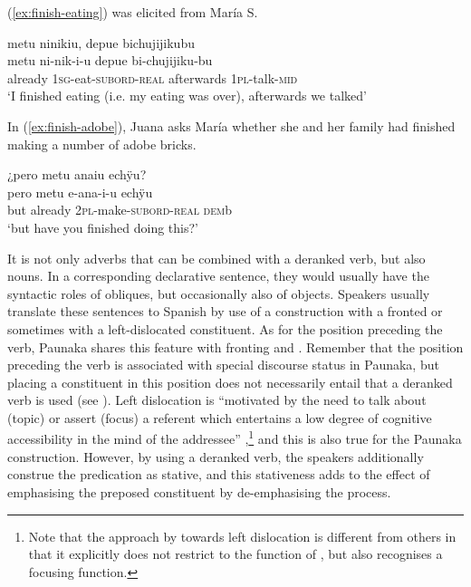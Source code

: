 (\ref{ex:finish-eating}) was elicited from María S.

\ea\label{ex:finish-eating}
\begingl
\glpreamble metu ninikiu, depue bichujijikubu\\
\gla metu ni-nik-i-u depue bi-chujijiku-bu\\
\glb already 1\textsc{sg}-eat-\textsc{subord}-\textsc{real} afterwards 1\textsc{pl}-talk-\textsc{mid}\\
\glft ‘I finished eating (i.e. my eating was over), afterwards we talked’
\endgl
\trailingcitation{[rxx-e181020le]}
\xe

In (\ref{ex:finish-adobe}), Juana asks María whether she and her family had finished making a number of adobe bricks.

\ea\label{ex:finish-adobe}
\begingl
\glpreamble ¿pero metu anaiu echÿu?\\
\gla pero metu e-ana-i-u echÿu\\
\glb but already 2\textsc{pl}-make-\textsc{subord}-\textsc{real} \textsc{dem}b\\
\glft ‘but have you finished doing this?’
\endgl
{}
\xe

It is not only adverbs that can be combined with a deranked verb, but also nouns. In a corresponding declarative sentence, they would usually have the syntactic roles of obliques, but occasionally also of objects. Speakers usually translate these sentences to Spanish by use of a construction with a fronted or sometimes with a left-dislocated constituent. As for the position preceding the verb, Paunaka shares this feature with fronting and . Remember that the position preceding the verb is associated with special discourse status in Paunaka, but placing a constituent in this position does not necessarily entail that a deranked verb is used (see ). Left dislocation is “motivated by the need to talk about (topic) or assert (focus) a referent which entertains a low degree of cognitive accessibility in the mind of the addressee” \citep[40]{Westbury2016},\footnote{Note that the approach by \citet[]{Westbury2016} towards left dislocation is different from others \citep[e.g.][]{Lambrecht2001a} in that it explicitly does not restrict  to the function of , but also recognises a focusing function.} and this is also true for the Paunaka construction. However, by using a deranked verb, the speakers additionally construe the predication as stative, and this stativeness adds to the effect of emphasising the preposed constituent by de-emphasising the process.

